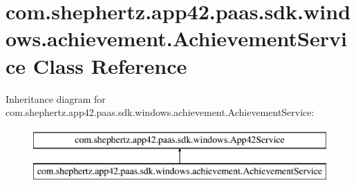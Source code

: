 \hypertarget{classcom_1_1shephertz_1_1app42_1_1paas_1_1sdk_1_1windows_1_1achievement_1_1_achievement_service}{\section{com.\+shephertz.\+app42.\+paas.\+sdk.\+windows.\+achievement.\+Achievement\+Service Class Reference}
\label{classcom_1_1shephertz_1_1app42_1_1paas_1_1sdk_1_1windows_1_1achievement_1_1_achievement_service}
}
Inheritance diagram for com.\+shephertz.\+app42.\+paas.\+sdk.\+windows.\+achievement.\+Achievement\+Service\+:\begin{figure}[H]
\begin{center}
\leavevmode
\includegraphics[height=2.000000cm]{classcom_1_1shephertz_1_1app42_1_1paas_1_1sdk_1_1windows_1_1achievement_1_1_achievement_service}
\end{center}
\end{figure}
